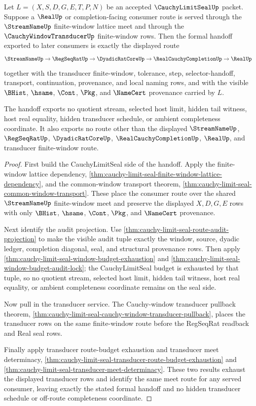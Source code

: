 \begin{theorem}
\label{thm:cauchy-limit-seal-window-budget-audit-lock-formal-handoff}
Let $L=(X,S,D,G,E,T,P,N)$ be an accepted $\CauchyLimitSealUp$ packet. Suppose a $\RealUp$ or completion-facing consumer route is served through the $\StreamNameUp$ finite-window lattice meet and through the $\CauchyWindowTransducerUp$ finite-window rows. Then the formal handoff exported to later consumers is exactly the displayed route
$$
\StreamNameUp \to \RegSeqRatUp \to \DyadicRatCoreUp \to \RealCauchyCompletionUp \to \RealUp
$$
together with the transducer finite-window, tolerance, step, selector-handoff, transport, continuation, provenance, and local naming rows, and with the visible $\BHist$, $\hsame$, $\Cont$, $\Pkg$, and $\NameCert$ provenance carried by $L$.

The handoff exports no quotient stream, selected host limit, hidden tail witness, host real equality, hidden transducer schedule, or ambient completeness coordinate. It also exports no route other than the displayed $\StreamNameUp$, $\RegSeqRatUp$, $\DyadicRatCoreUp$, $\RealCauchyCompletionUp$, $\RealUp$, and transducer finite-window route.
\end{theorem}
\begin{proof}
First build the CauchyLimitSeal side of the handoff. Apply the finite-window lattice dependency, \autoref{thm:cauchy-limit-seal-finite-window-lattice-dependency}, and the common-window transport theorem, \autoref{thm:cauchy-limit-seal-common-window-transport}. These place the consumer route over the shared $\StreamNameUp$ finite-window meet and preserve the displayed $X,D,G,E$ rows with only $\BHist$, $\hsame$, $\Cont$, $\Pkg$, and $\NameCert$ provenance.

Next identify the audit projection. Use \autoref{thm:cauchy-limit-seal-route-audit-projection} to make the visible audit tuple exactly the window, source, dyadic ledger, completion diagonal, seal, and structural provenance rows. Then apply \autoref{thm:cauchy-limit-seal-window-budget-exhaustion} and \autoref{thm:cauchy-limit-seal-window-budget-audit-lock}; the CauchyLimitSeal budget is exhausted by that tuple, so no quotient stream, selected host limit, hidden tail witness, host real equality, or ambient completeness coordinate remains on the seal side.

Now pull in the transducer service. The Cauchy-window transducer pullback theorem, \autoref{thm:cauchy-limit-seal-cauchy-window-transducer-pullback}, places the transducer rows on the same finite-window route before the RegSeqRat readback and Real seal rows.

Finally apply transducer route-budget exhaustion and transducer meet determinacy, \autoref{thm:cauchy-limit-seal-transducer-route-budget-exhaustion} and \autoref{thm:cauchy-limit-seal-transducer-meet-determinacy}. These two results exhaust the displayed transducer rows and identify the same meet route for any served consumer, leaving exactly the stated formal handoff and no hidden transducer schedule or off-route completeness coordinate.
\end{proof}
